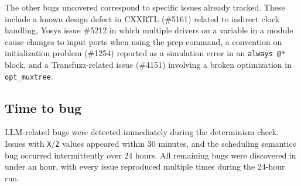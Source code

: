 The other bugs uncovered correspond to specific issues already tracked.
These include a known design defect in CXXRTL (\#5161) related to indirect clock handling, Yosys issue \#5212 in which multiple drivers on a variable in a module cause changes to input ports when using the prep command, a convention on initialization problem (\#1254) reported as a simulation error in an \texttt{always @*} block, and a Transfuzz-related issue (\#4151) involving a broken optimization in \texttt{opt\_muxtree}.


\subsection{Time to bug}\label{sec:eval:timetobugs}

LLM-related bugs were detected immediately during the determinism check.
Issues with \texttt{X}/\texttt{Z} values appeared within 30 minutes, and the scheduling semantics bug occurred intermittently over 24 hours.
All remaining bugs were discovered in under an hour, with every issue reproduced multiple times during the 24-hour run.

